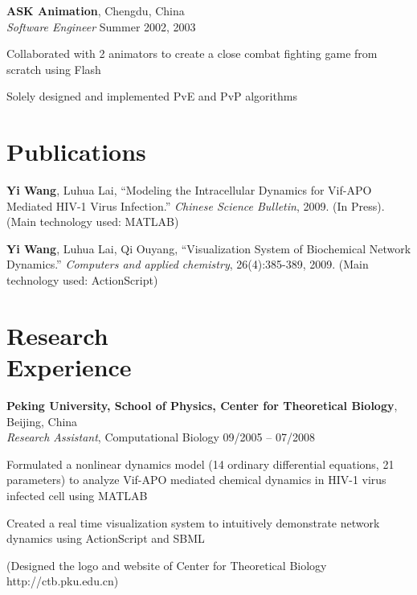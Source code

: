 \documentclass[margin,line]{resume}
\begin{document}
\begin{resume}
    \textbf{ASK Animation}, Chengdu, China \\
    \textsl{Software Engineer} \hfill Summer 2002, 2003 \vspace{-3mm}\\\vspace{-1mm}%
     \begin{list2}
      \item Collaborated with 2 animators to create a close combat fighting game from scratch using Flash 
      \item Solely designed and implemented PvE and PvP algorithms
     \end{list2}

    \section{\mysidestyle Publications}

      \textbf{Yi Wang}, Luhua Lai, ``Modeling the Intracellular Dynamics for Vif-APO Mediated HIV-1 Virus Infection.''
      \textsl{Chinese Science Bulletin}, 2009. (In Press). (Main technology used: MATLAB) 

      \textbf{Yi Wang}, Luhua Lai, Qi Ouyang, ``Visualization System of Biochemical Network Dynamics.''
      \textsl{Computers and applied chemistry}, 26(4):385-389, 2009. (Main technology used: ActionScript)

    \section{\mysidestyle Research \\ Experience}

    \textbf{Peking University, School of Physics, Center for Theoretical Biology}, Beijing, China \\
    \textsl{Research Assistant}, Computational Biology \hfill 09/2005 -- 07/2008 \vspace{-3mm}\\\vspace{-1mm}%
      \begin{list2}
      \item Formulated a nonlinear dynamics model (14 ordinary differential equations, 21 parameters) to analyze Vif-APO mediated chemical dynamics in HIV-1 virus infected cell using MATLAB
      \item Created a real time visualization system to intuitively demonstrate network dynamics using ActionScript and SBML 
      \item (Designed the logo and website of Center for Theoretical Biology http://ctb.pku.edu.cn)
      \end{list2}


\end{resume}
\end{document}

